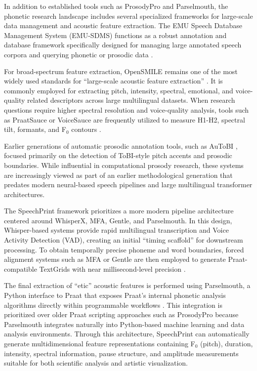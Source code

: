 In addition to established tools such as ProsodyPro and Parselmouth, the phonetic research landscape includes several specialized frameworks for large-scale data management and acoustic feature extraction. The EMU Speech Database Management System (EMU-SDMS) functions as a robust annotation and database framework specifically designed for managing large annotated speech corpora and querying phonetic or prosodic data \cite{winkelmann2017emu}. 

For broad-spectrum feature extraction, OpenSMILE remains one of the most widely used standards for ``large-scale acoustic feature extraction'' \cite{eyben2010opensmile}. It is commonly employed for extracting pitch, intensity, spectral, emotional, and voice-quality related descriptors across large multilingual datasets. When research questions require higher spectral resolution and voice-quality analysis, tools such as PraatSauce or VoiceSauce are frequently utilized to measure H1-H2, spectral tilt, formants, and F$_0$ contours \cite{shue2011voicesauce}. 

Earlier generations of automatic prosodic annotation tools, such as AuToBI \cite{rosenberg2010autobi}, focused primarily on the detection of ToBI-style pitch accents and prosodic boundaries. While influential in computational prosody research, these systems are increasingly viewed as part of an earlier methodological generation that predates modern neural-based speech pipelines and large multilingual transformer architectures.

The SpeechPrint framework prioritizes a more modern pipeline architecture centered around WhisperX, MFA, Gentle, and Parselmouth. In this design, Whisper-based systems provide rapid multilingual transcription and Voice Activity Detection (VAD), creating an initial ``timing scaffold'' for downstream processing. To obtain temporally precise phoneme and word boundaries, forced alignment systems such as MFA or Gentle are then employed to generate Praat-compatible TextGrids with near millisecond-level precision \cite{mcauliffe2017mfa}. 

The final extraction of ``etic'' acoustic features is performed using Parselmouth, a Python interface to Praat that exposes Praat’s internal phonetic analysis algorithms directly within programmable workflows \cite{jadoul2018parselmouth}. This integration is prioritized over older Praat scripting approaches such as ProsodyPro because Parselmouth integrates naturally into Python-based machine learning and data analysis environments. Through this architecture, SpeechPrint can automatically generate multidimensional feature representations containing F$_0$ (pitch), duration, intensity, spectral information, pause structure, and amplitude measurements suitable for both scientific analysis and artistic visualization.

